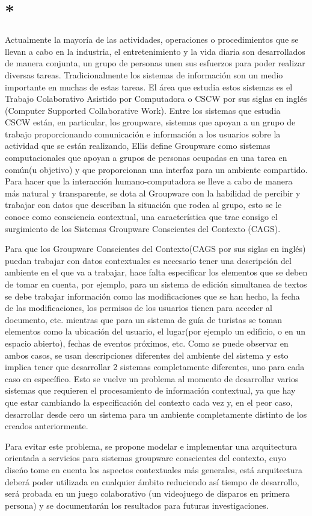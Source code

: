 \section{*}
\label{sec:intro}
Actualmente la mayor\'ia de las actividades, operaciones o procedimientos que se llevan a cabo en la industria, el entretenimiento y la vida diaria son desarrollados de manera conjunta, un grupo de personas unen sus esfuerzos para poder realizar diversas tareas. Tradicionalmente los sistemas de informaci\'on son un medio importante en muchas de estas tareas. El \'area que estudia estos sistemas es el Trabajo Colaborativo Asistido por Computadora o CSCW por sus siglas en ingl\'es (Computer Supported Collaborative Work). Entre los sistemas que estudia CSCW est\'an, en particular, los groupware, sistemas que apoyan a un grupo de trabajo proporcionando comunicaci\'on e informaci\'on a los usuarios sobre la actividad que se est\'an realizando, Ellis \cite{ellis1991groupware} define Groupware como sistemas computacionales que apoyan a grupos de personas ocupadas en una tarea en com\'un(u objetivo) y que proporcionan una interfaz para un ambiente compartido. Para hacer que la interacci\'on humano-computadora se lleve a cabo de manera m\'as natural y transparente, se dota al Groupware con la habilidad de percibir y trabajar con datos que describan la situaci\'on que rodea al grupo, esto se le conoce como consciencia contextual, una caracter\'istica que trae consigo el surgimiento de los Sistemas Groupware Conscientes del Contexto (CAGS).


Para que los Groupware Conscientes del Contexto(CAGS por sus siglas en ingl\'es) puedan trabajar con datos contextuales es necesario tener una descripci\'on del ambiente en el que va a trabajar, hace falta especificar los elementos que se deben de tomar en cuenta, por ejemplo, para un sistema de edici\'on simultanea de textos se debe trabajar informaci\'on como las modificaciones que se han hecho, la fecha de las modificaciones, los permisos de los usuarios tienen para acceder al documento, etc. mientras que para un sistema de gu\'ia de turistas se toman elementos como la ubicaci\'on del usuario, el lugar(por ejemplo un edificio, o en un espacio abierto), fechas de eventos pr\'oximos, etc. Como se puede observar en ambos casos, se usan descripciones diferentes del ambiente del sistema y esto implica tener que desarrollar 2 sistemas completamente diferentes, uno para cada caso en espec\'ifico. Esto se vuelve un problema al momento de desarrollar varios sistemas que requieren el procesamiento de informaci\'on contextual, ya que hay que estar cambiando la especificaci\'on del contexto cada vez y, en el peor caso, desarrollar desde cero un sistema para un ambiente completamente distinto de los creados anteriormente.

Para evitar este problema, se propone modelar e implementar una arquitectura orientada a servicios para sistemas groupware conscientes del contexto, cuyo dise\'no tome en cuenta los aspectos contextuales m\'as generales, est\'a arquitectura deber\'a poder utilizada en cualquier \'ambito reduciendo as\'i tiempo de desarrollo, ser\'a probada en un juego colaborativo (un videojuego de disparos en primera persona) y se documentar\'an los resultados para futuras investigaciones.

